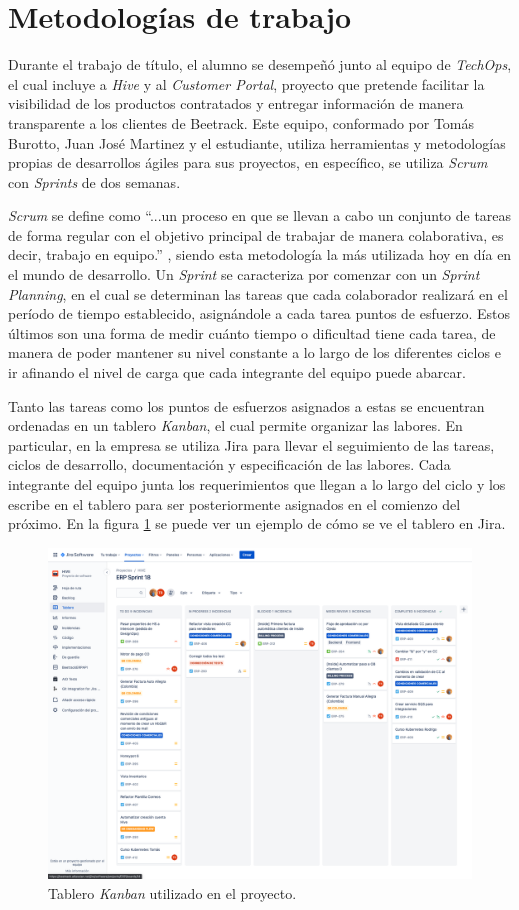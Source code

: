 \section{Metodologías de trabajo}

    Durante el trabajo de título, el alumno se desempeñó junto al equipo de \textit{TechOps}, el cual incluye a \textit{Hive} y al \textit{Customer Portal}, proyecto que pretende facilitar la visibilidad de los productos contratados y entregar información de manera transparente a los clientes de Beetrack. Este equipo, conformado por Tomás Burotto, Juan José Martinez y el estudiante, utiliza herramientas y metodologías propias de desarrollos ágiles para sus proyectos, en específico, se utiliza \textit{Scrum} con \textit{Sprints} de dos semanas.
    
    \textit{Scrum} se define como ``...un proceso en que se llevan a cabo un conjunto de tareas de forma regular con el objetivo principal de trabajar de manera colaborativa, es decir, trabajo en equipo.'' \cite{scrum_definition}, siendo esta metodología la más utilizada hoy en día en el mundo de desarrollo. Un \textit{Sprint} se caracteriza por comenzar con un \textit{Sprint Planning}, en el cual se determinan las tareas que cada colaborador realizará en el período de tiempo establecido, asignándole a cada tarea puntos de esfuerzo. Estos últimos son una forma de medir cuánto tiempo o dificultad tiene cada tarea, de manera de poder mantener su nivel constante a lo largo de los diferentes ciclos e ir  afinando el nivel de carga que cada integrante del equipo puede abarcar.
    
    Tanto las tareas como los puntos de esfuerzos asignados a estas se encuentran ordenadas en un tablero \textit{Kanban}, el cual permite organizar las labores. En particular, en la empresa se utiliza Jira para llevar el seguimiento de las tareas, ciclos de desarrollo, documentación y especificación de las labores. Cada integrante del equipo junta los requerimientos que llegan a lo largo del ciclo y los escribe en el tablero para ser posteriormente asignados en el comienzo del próximo. En la figura \ref{fig:kanban} se puede ver un ejemplo de cómo se ve el tablero en Jira.
    
    \begin{figure}
        \centering
        \includegraphics[width=0.75\linewidth]{figures/jira.png}
        \caption{Tablero \textit{Kanban} utilizado en el proyecto.}
        \label{fig:kanban}
    \end{figure}
    

